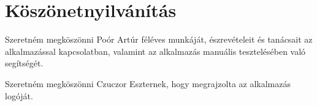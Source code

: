 \chapter{Köszönetnyilvánítás} %
\label{ch:acknowledgments}
Szeretném megköszönni Poór Artúr féléves munkáját, észrevételeit és tanácsait az alkalmazással kapcsolatban, valamint az alkalmazás manuális tesztelésében való segítségét.

Szeretném megköszönni Czuczor Eszternek, hogy megrajzolta az alkalmazás logóját.